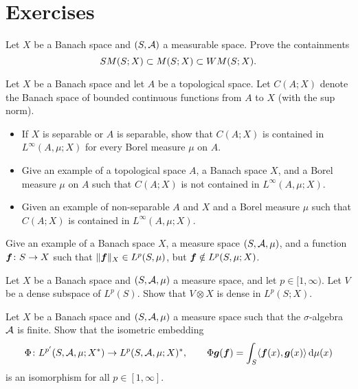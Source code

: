 \section*{Exercises}

\begin{exercise}\label{ex:measurability-containments}
  Let $X$ be a Banach space and $(S,\mathcal{A})$ a measurable space.
  Prove the containments
  \begin{equation*}
    SM(S;X) \subset M(S;X) \subset WM(S;X).
  \end{equation*}
\end{exercise}

\begin{exercise}\label{ex:continuous-Linfty}
  Let $X$ be a Banach space and let $A$ be a topological space.
  Let $C(A;X)$ denote the Banach space of bounded continuous functions from $A$ to $X$ (with the sup norm).
  \begin{itemize}
  \item If $X$ is separable or $A$ is separable, show that $C(A;X)$ is contained in $L^\infty(A, \mu;X)$ for every Borel measure $\mu$ on $A$. 
  \item Give an example of a topological space $A$, a Banach space $X$, and a Borel measure $\mu$ on $A$ such that $C(A;X)$ is not contained in $L^\infty(A,\mu;X)$.
  \item Given an example of non-separable $A$ and $X$ and a Borel measure $\mu$ such that $C(A;X)$ is contained in $L^\infty(A,\mu;X)$. 
  \end{itemize}
\end{exercise}

\begin{exercise}\label{ex:Lp-issues}
  Give an example of a Banach space $X$, a measure space $(S,\mathcal{A},\mu)$, and a function $\bm{f} \colon S \rightarrow X$ such that $\|\bm{f}\|_{X} \in L^p(S,\mu)$, but $\bm{f} \notin L^p(S,\mu;X)$.
\end{exercise}

\begin{exercise}\label{ex:general-density}
  Let $X$ be a Banach space and $(S,\mathcal{A},\mu)$ a measure space, and let $p \in [1,\infty)$.
  Let $V$ be a dense subspace of $L^p(S)$.
  Show that $V \otimes X$ is dense in $L^p(S;X)$.
\end{exercise}

\begin{exercise}\label{ex:finite-sigma-alg-duality}
  Let $X$ be a Banach space and $(S,\mathcal{A},\mu)$ a measure space such that the $\sigma$-algebra $\mathcal{A}$ is finite.
  Show that the isometric embedding
  \begin{equation*}
    \Phi \colon L^{p'}(S,\mathcal{A},\mu;X^*) \rightarrow L^p(S,\mathcal{A},\mu;X)^*, \qquad \Phi \bm{g}(\bm{f}) = \int_S \langle \bm{f}(x), \bm{g}(x) \rangle \, \mathrm{d}\mu(x)
  \end{equation*}
  is an isomorphism for all $p \in [1,\infty]$.
\end{exercise}


